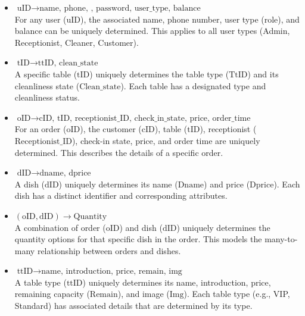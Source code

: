 \documentclass[12pt]{article}
\begin{document}
\begin{itemize}
    \item \( \text{uID} \rightarrow \text{name, phone, , password, user\_type, balance} \)  \\
    For any user (\( \text{uID} \)), the associated name, phone number, user type (role), and balance can be uniquely determined. This applies to all user types (Admin, Receptionist, Cleaner, Customer).

    \item \( \text{tID} \rightarrow \text{ttID, clean\_state} \)  \\
    A specific table (\( \text{tID} \)) uniquely determines the table type (\( \text{TtID} \)) and its cleanliness state (\( \text{Clean\_state} \)). Each table has a designated type and cleanliness status.

    \item \( \text{oID} \rightarrow \text{cID, tID, receptionist\_ID, check\_in\_state, price, order\_time} \)  \\
    For an order (\( \text{oID} \)), the customer (\( \text{cID} \)), table (\( \text{tID} \)), receptionist (\( \text{Receptionist\_ID} \)), check-in state, price, and order time are uniquely determined. This describes the details of a specific order.

    \item \( \text{dID} \rightarrow \text{dname, dprice} \)  \\
    A dish (\( \text{dID} \)) uniquely determines its name (\( \text{Dname} \)) and price (\( \text{Dprice} \)). Each dish has a distinct identifier and corresponding attributes.

    \item \( (\text{oID}, \text{dID}) \rightarrow \text{Quantity} \)  \\
    A combination of order (\( \text{oID} \)) and dish (\( \text{dID} \)) uniquely determines the quantity  options for that specific dish in the order. This models the many-to-many relationship between orders and dishes.

    \item \( \text{ttID} \rightarrow \text{name, introduction, price, remain, img} \)  \\
    A table type (\( \text{ttID} \)) uniquely determines its name, introduction, price, remaining capacity (\( \text{Remain} \)), and image (\( \text{Img} \)). Each table type (e.g., VIP, Standard) has associated details that are determined by its type.
\end{itemize}
\end{document}
